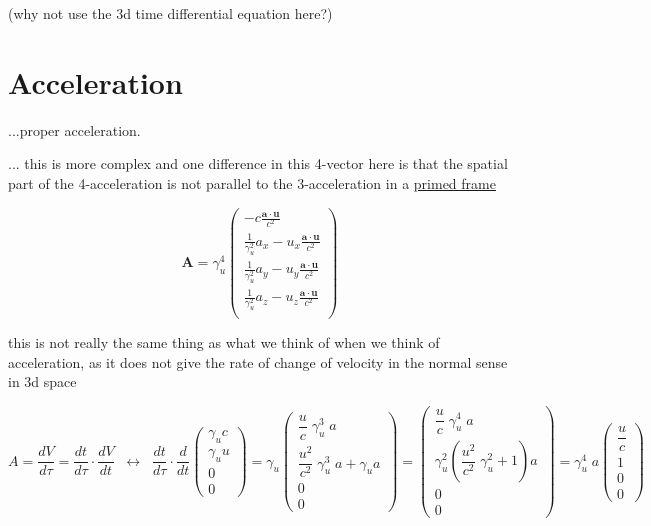 (why not use the 3d time differential equation here?)

\section{Acceleration}

...proper acceleration.

... this is more complex and one difference in this 4-vector here is that the spatial part of the 4-acceleration is not parallel to the 3-acceleration in a \hyperlink{def-Primed-Frame}{primed frame}

\begin{equation}
	\mathbf{A} = \gamma_u^4
	\begin{pmatrix}
		-c\frac{\mathbf{a}\cdot\mathbf{u}}{c^2}                              \\
		\frac{1}{\gamma_u^2} a_x - u_x \frac{\mathbf{a}\cdot\mathbf{u}}{c^2} \\
		\frac{1}{\gamma_u^2} a_y - u_y \frac{\mathbf{a}\cdot\mathbf{u}}{c^2} \\
		\frac{1}{\gamma_u^2} a_z - u_z \frac{\mathbf{a}\cdot\mathbf{u}}{c^2} \\
	\end{pmatrix}
\end{equation}

this is not really the same thing as what we think of when we think of acceleration, as it does not give the rate of change of velocity in the normal sense in 3d space

\begin{equation}
	A=\dfrac{dV}{d\tau}=
	\dfrac{dt}{d\tau}\cdot\dfrac{dV}{dt} \;\;\leftrightarrow\;\; \dfrac{dt}{d\tau}\cdot \dfrac{d}{dt}
	\left(\begin{array}{*{20}{c}} \gamma_u c \\ \gamma_u u \\ 0 \\ 0 \end{array}\right)
	= \gamma_u
	\left(\begin{array}{*{20}{c}} \dfrac{u}{c}\;\gamma_u^3\;a \\ \dfrac{u^2}{c^2}\;\gamma_u^3\;a+\gamma_u a \\ 0 \\ 0 \end{array}\right)
	=
	\left(\begin{array}{*{20}{c}} \dfrac{u}{c}\;\gamma_u^4\;a \\ \gamma_u^2\left(\dfrac{u^2}{c^2}\;\gamma_u^2+1\right)a \\ 0 \\ 0 \end{array}\right)
	= \gamma_u^4\;a
	\left(\begin{array}{*{20}{c}} \dfrac{u}{c} \\ 1 \\ 0 \\ 0 \end{array}\right)
\end{equation}

